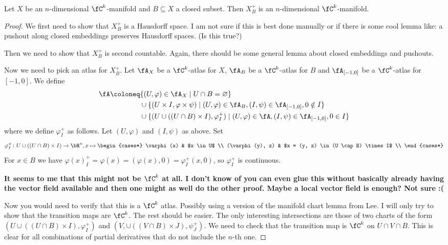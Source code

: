 \begin{lem}
    Let $X$ be an $n$-dimensional $\fC^k$-manifold and $B \subseteq X$ a closed subset. 
    Then $X^+_B$ is an $n$-dimensional $\fC^k$-manifold. 
\end{lem}
\begin{proof}
    We first need to show that $X^+_B$ is a Hausdorff space. I am not sure if this is best done manually or if there is some cool lemma like: a pushout along closed embeddings preserves Hausdorff spaces. (Is this true?)

    Then we need to show that $X^+_B$ is second countable. Again, there should be some general lemma about closed embeddings and pushouts. 

    Now we need to pick an atlas for $X^+_B$.
    Let $\fA_X$ be a $\fC^k$-atlas for $X$, $\fA_B$ be a $\fC^k$-atlas for $B$ and $\fA_{[-1, 0]}$ be a $\fC^k$-atlas for $[-1, 0]$. 
    We define 
    \begin{align*}
        \fA \coloneq &\{(U, \varphi) \in \fA_X \mid U \cap B = \varnothing\} \\
        &\cup \{(U \times I, \varphi \times \psi) \mid (U, \varphi) \in \fA_B, (I, \psi) \in \fA_{[-1, 0]}, 0 \notin I\} \\
        &\cup \{(U \cup ((U \cap B) \times I), \varphi^+_I) \mid (U, \varphi) \in \fA, (I, \psi) \in \fA_{[-1, 0]}, 0 \in I\}
    \end{align*}
    where we define $\varphi^+_I$ as follows. 
    Let $(U, \varphi)$ and $(I, \psi)$ as above. 
    Set 
    \begin{equation*}
        \varphi^+_I \colon U \cup ((U \cap B) \times I) \to \bR^n, x \mapsto \begin{cases*}
            \varphi (x) & $x \in U$ \\ 
            (\varphi(y), z) & $x = (y, z) \in (U \cap B) \times I$ \\
        \end{cases*}
    \end{equation*}
    For $x \in B$ we have $\varphi(x)^+_I = \varphi(x) = (\varphi(x), 0) = \varphi^+_I(x, 0)$, so $\varphi^+_I$ is continuous. 

    \textbf{It seems to me that this might not be $\fC^k$ at all. I don't know of you can even glue this without basically already having the vector field available and then one might as well do the other proof. Maybe a local vector field is enough? Not sure :(}

    Now you would need to verify that this is a $\fC^k$ atlas. 
    Possibly using a version of the manifold chart lemma from Lee. 
    I will only try to show that the transition maps are $\fC^k$. 
    The rest should be easier. 
    The only interesting intersections are those of two charts of the form $(U \cup ((U \cap B) \times I), \varphi^+_I)$ and $(V, \cup ((V \cap B) \times J), \psi^+_J)$. 
    We need to check that the transition map is $\fC^k$ on $U \cap V \cap B$. 
    This is clear for all combinations of partial derivatives that do not include the $n$-th one. 
\end{proof}

